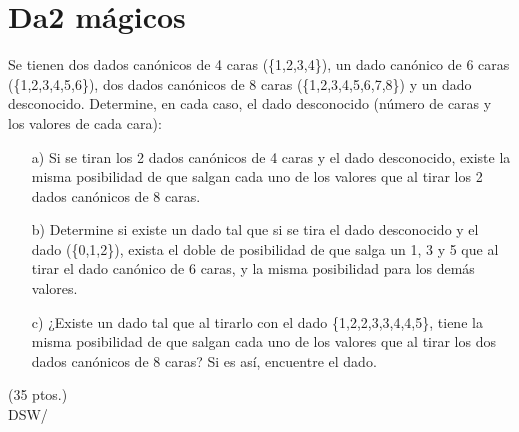 \documentclass[spanish, fleqn]{article}
\begin{document}
	\section{Da2 mágicos}
    Se tienen dos dados canónicos de 4 caras (\{1,2,3,4\}), un dado canónico de 6 caras (\{1,2,3,4,5,6\}), dos dados canónicos de 8 caras (\{1,2,3,4,5,6,7,8\}) y un dado desconocido. Determine, en cada caso, el dado desconocido (número de caras y los valores de cada cara):
    \begin{itemize}
    \item[a)] Si se tiran los 2 dados canónicos de 4 caras y el dado desconocido, existe la misma posibilidad de que salgan cada uno de los valores que al tirar los 2 dados canónicos de 8 caras.
    \item[b)] Determine si existe un dado tal que si se tira el dado desconocido y el dado (\{0,1,2\}), exista el doble de posibilidad de que salga un 1, 3 y 5 que al tirar el dado canónico de 6 caras, y la misma posibilidad para los demás valores.
    \item[c)] ¿Existe un dado tal que al tirarlo con el dado \{1,2,2,3,3,4,4,5\}, tiene la misma posibilidad de que salgan cada uno de los valores que al tirar los dos dados canónicos de 8 caras? Si es así, encuentre el dado.
	\end{itemize}
    
	\hfill (35 ptos.)\\
	\vfill\hfill DSW/\LaTeXe
\end{document}
